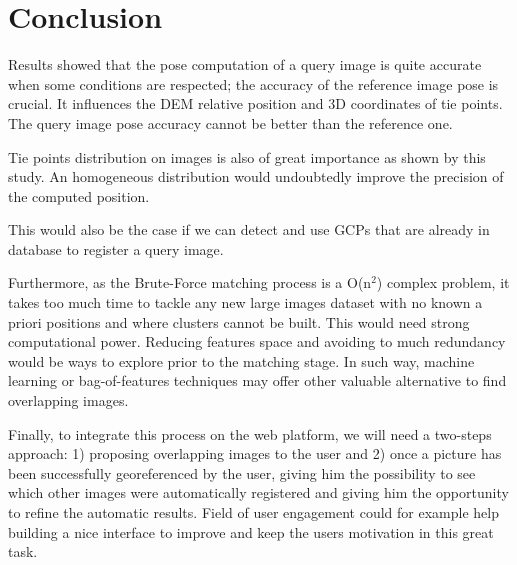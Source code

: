 \documentclass[fleqn,10pt]{wlpeerj} %
\begin{document}
\section*{Conclusion}
Results showed that the pose computation of a query image is quite accurate
when some conditions are respected;  the accuracy of the reference image
pose is crucial. It influences the DEM relative position and 3D coordinates of
tie points. The query image pose accuracy cannot be better than the reference one.

Tie points distribution on images is also of great importance as shown by this
study. An homogeneous distribution would undoubtedly improve the precision of the
computed position.

This would also be the case if we can detect and use GCPs that are already 
in database to register a query image. 

Furthermore, as the Brute-Force matching process is a O(n$^{2}$) complex problem, 
it takes too much time to tackle any new large images dataset with no known 
a priori positions and where clusters cannot be built. This would need strong
computational power.
Reducing features space and avoiding to much redundancy would be ways to explore 
prior to the matching stage.
In such way, machine learning or bag-of-features techniques may offer other 
valuable alternative to find overlapping images.


Finally, to integrate this process on the web platform, we will need a two-steps
approach: 1) proposing overlapping images to the user and 2) once a picture has 
been successfully georeferenced by the user, giving him the possibility to see
which other images were automatically registered and giving him the opportunity
to refine the automatic results. Field of user engagement could for example 
help building a nice interface to improve and keep the users motivation in this 
great task.





\end{document}

